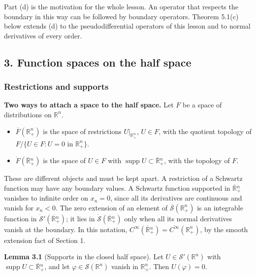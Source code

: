 \documentclass[
  11pt,
]{article}
\providecommand{\tightlist}{%
  \setlength{\itemsep}{0pt}\setlength{\parskip}{0pt}}
\begin{document}
Part (d) is the motivation for the whole lesson. An operator that
respects the boundary in this way can be followed by boundary operators.
Theorem 5.1(c) below extends (d) to the pseudodifferential operators of
this lesson and to normal derivatives of every order.

\subsection{3. Function spaces on the half
space}\label{function-spaces-on-the-half-space}

\subsubsection{Restrictions and
supports}\label{restrictions-and-supports}

\textbf{Two ways to attach a space to the half space.} Let \(F\) be a
space of distributions on \(\mathbb R^n\).

\begin{itemize}
\tightlist
\item
  \(\overline F(\mathbb R^n_+)\) is the space of restrictions
  \(U|_{\mathbb R^n_+}\), \(U\in F\), with the quotient topology of
  \(F/\{U\in F:U=0\text{ in }\mathbb R^n_+\}\).
\item
  \(\dot F(\overline{\mathbb R}{}^n_+)\) is the space of \(U\in F\) with
  \(\operatorname{supp}U\subset\overline{\mathbb R}{}^n_+\), with the
  topology of \(F\).
\end{itemize}

These are different objects and must be kept apart. A restriction of a
Schwartz function may have any boundary values. A Schwartz function
supported in \(\overline{\mathbb R}{}^n_+\) vanishes to infinite order
on \(x_n=0\), since all its derivatives are continuous and vanish for
\(x_n<0\). The zero extension of an element of
\(\overline{\mathcal S}(\mathbb R^n_+)\) is an integrable function in
\(\dot{\mathcal S}'(\overline{\mathbb R}{}^n_+)\); it lies in
\(\dot{\mathcal S}(\overline{\mathbb R}{}^n_+)\) only when all its
normal derivatives vanish at the boundary. In this notation,
\(C^\infty(\overline{\mathbb R}{}^n_+)=\overline{C^\infty}(\mathbb R^n_+)\),
by the smooth extension fact of Section 1.

\textbf{Lemma 3.1} (Supports in the closed half space). Let
\(U\in\mathcal S'(\mathbb R^n)\) with
\(\operatorname{supp}U\subset\overline{\mathbb R}{}^n_+\), and let
\(\varphi\in\mathcal S(\mathbb R^n)\) vanish in \(\mathbb R^n_+\). Then
\(U(\varphi)=0\).
\end{document}
